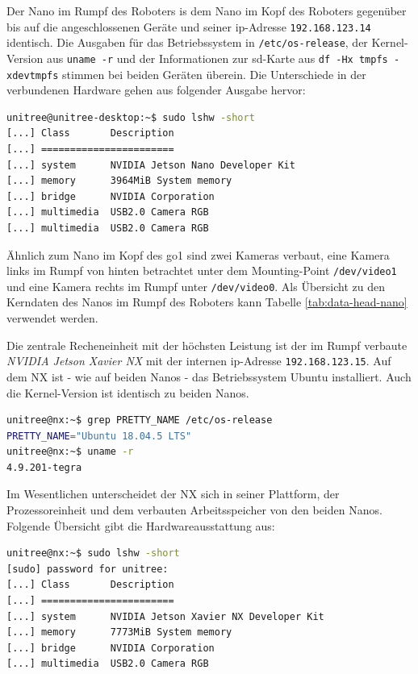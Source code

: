 \label{par:nano-rumpf}

Der Nano im Rumpf des Roboters is dem Nano im Kopf des Roboters gegenüber bis auf die angeschlossenen Geräte und seiner
\gls{ip}-Adresse \texttt{192\allowbreak .168\allowbreak .123\allowbreak .14} identisch.
Die Ausgaben für das Betriebssystem in \texttt{/etc/os-release}, der Kernel-Version aus \texttt{uname -r} und der Informationen
zur \gls{sd}-Karte aus \texttt{df -Hx tmpfs -xdevtmpfs} stimmen bei beiden Geräten überein.
Die Unterschiede in der verbundenen Hardware gehen aus folgender Ausgabe hervor:

\begin{lstlisting}[language=sh, label=lst:nanos-hardware-rumpf, columns=fixed]
unitree@unitree-desktop:~$ sudo lshw -short
[...] Class       Description
[...] =======================
[...] system      NVIDIA Jetson Nano Developer Kit
[...] memory      3964MiB System memory
[...] bridge      NVIDIA Corporation
[...] multimedia  USB2.0 Camera RGB
[...] multimedia  USB2.0 Camera RGB
\end{lstlisting}

Ähnlich zum Nano im Kopf des \gls{go1} sind zwei Kameras verbaut, eine Kamera links im Rumpf von hinten betrachtet unter dem Mounting-Point
\texttt{/dev/video1} und eine Kamera rechts im Rumpf unter \texttt{/dev/video0}.
Als Übersicht zu den Kerndaten des Nanos im Rumpf des Roboters kann Tabelle \ref{tab:data-head-nano} verwendet werden.

\label{par:nx}

Die zentrale Recheneinheit mit der höchsten Leistung ist der im Rumpf verbaute \emph{NVIDIA Jetson Xavier NX} mit der internen
\gls{ip}-Adresse \texttt{192.168.123.15}.
Auf dem NX ist - wie auf beiden Nanos - das Betriebssystem Ubuntu installiert.
Auch die Kernel-Version ist identisch zu beiden Nanos.

\begin{lstlisting}[language=sh, label=lst:nx-os]
unitree@nx:~$ grep PRETTY_NAME /etc/os-release
PRETTY_NAME="Ubuntu 18.04.5 LTS"
unitree@nx:~$ uname -r
4.9.201-tegra
\end{lstlisting}

Im Wesentlichen unterscheidet der NX sich in seiner Plattform, der Prozessoreinheit und dem verbauten Arbeitsspeicher
von den beiden Nanos.
Folgende Übersicht gibt die Hardwareausstattung aus:

\begin{lstlisting}[language=sh, label=lst:nanos-hardware-rumpf-nx, columns=fixed]
unitree@nx:~$ sudo lshw -short
[sudo] password for unitree:
[...] Class       Description
[...] =======================
[...] system      NVIDIA Jetson Xavier NX Developer Kit
[...] memory      7773MiB System memory
[...] bridge      NVIDIA Corporation
[...] multimedia  USB2.0 Camera RGB
\end{lstlisting}

